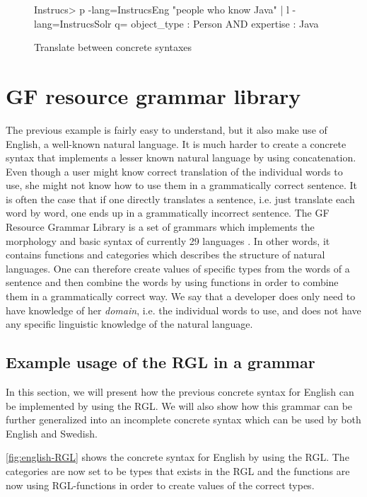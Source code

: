 \begin{figure}[H]
\begin{terminal}
Instrucs> p -lang=InstrucsEng "people who know Java" | l -lang=InstrucsSolr
q= object_type : Person AND expertise : Java
\end{terminal}
\caption{Translate between concrete syntaxes\label{fig:translation-concr}}
\end{figure}

\section{GF resource grammar library}

The previous example is fairly easy to understand, but it also make use of English, a well-known natural language. It is much harder to create a concrete syntax that implements a lesser known natural language by using concatenation. Even though a user might know correct translation of the individual words to use, she might not know how to use them in a grammatically correct sentence. It is often the case that if one directly translates a sentence, i.e. just translate each word by word, one ends up in a grammatically incorrect sentence.
\newline
\newline
The GF Resource Grammar Library is a set of grammars which implements the morphology and basic syntax of currently 29 languages \cite{gf-rgl}. In other words, it contains functions and categories which describes the structure of natural languages. One can therefore create values of specific types from the words of a sentence and then combine the words by using functions in order to combine them in a grammatically correct way. We say that a developer does only need to have knowledge of her \emph{domain}, i.e. the individual words to use, and does not have any specific linguistic knowledge of the natural language.

\subsection*{Example usage of the RGL in a grammar}

In this section, we will present how the previous concrete syntax for English can be implemented by using the RGL. We will also show how this grammar can be further generalized into an incomplete concrete syntax which can be used by both English and Swedish.

\autoref{fig:english-RGL} shows the concrete syntax for English by using the RGL. The categories are now set to be types that exists in the RGL and the functions are now using RGL-functions in order to create values of the correct types.

